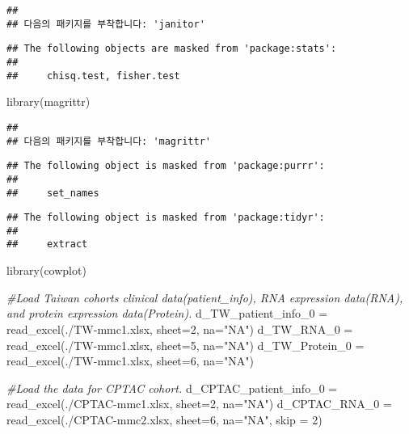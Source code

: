 \documentclass[
]{article}
\newenvironment{Shaded}{\begin{snugshade}}{\end{snugshade}}
\newcommand{\AttributeTok}[1]{\textcolor[rgb]{0.77,0.63,0.00}{#1}}
\newcommand{\CommentTok}[1]{\textcolor[rgb]{0.56,0.35,0.01}{\textit{#1}}}
\newcommand{\DecValTok}[1]{\textcolor[rgb]{0.00,0.00,0.81}{#1}}
\newcommand{\FunctionTok}[1]{\textcolor[rgb]{0.00,0.00,0.00}{#1}}
\newcommand{\NormalTok}[1]{#1}
\newcommand{\OtherTok}[1]{\textcolor[rgb]{0.56,0.35,0.01}{#1}}
\newcommand{\StringTok}[1]{\textcolor[rgb]{0.31,0.60,0.02}{#1}}
\begin{document}
\begin{verbatim}
## 
## 다음의 패키지를 부착합니다: 'janitor'
\end{verbatim}

\begin{verbatim}
## The following objects are masked from 'package:stats':
## 
##     chisq.test, fisher.test
\end{verbatim}

\begin{Shaded}
\begin{Highlighting}[]
\FunctionTok{library}\NormalTok{(magrittr)}
\end{Highlighting}
\end{Shaded}

\begin{verbatim}
## 
## 다음의 패키지를 부착합니다: 'magrittr'
\end{verbatim}

\begin{verbatim}
## The following object is masked from 'package:purrr':
## 
##     set_names
\end{verbatim}

\begin{verbatim}
## The following object is masked from 'package:tidyr':
## 
##     extract
\end{verbatim}

\begin{Shaded}
\begin{Highlighting}[]
\FunctionTok{library}\NormalTok{(cowplot)}

\CommentTok{\#Load Taiwan cohort\textquotesingle{}s clinical data(patient\_info), RNA expression data(RNA), and protein expression data(Protein).}
\NormalTok{d\_TW\_patient\_info\_0 }\OtherTok{=} \FunctionTok{read\_excel}\NormalTok{(}\StringTok{\textquotesingle{}./TW{-}mmc1.xlsx\textquotesingle{}}\NormalTok{, }\AttributeTok{sheet=}\DecValTok{2}\NormalTok{, }\AttributeTok{na=}\StringTok{"NA"}\NormalTok{)}
\NormalTok{d\_TW\_RNA\_0 }\OtherTok{=} \FunctionTok{read\_excel}\NormalTok{(}\StringTok{\textquotesingle{}./TW{-}mmc1.xlsx\textquotesingle{}}\NormalTok{, }\AttributeTok{sheet=}\DecValTok{5}\NormalTok{, }\AttributeTok{na=}\StringTok{"NA"}\NormalTok{)}
\NormalTok{d\_TW\_Protein\_0 }\OtherTok{=} \FunctionTok{read\_excel}\NormalTok{(}\StringTok{\textquotesingle{}./TW{-}mmc1.xlsx\textquotesingle{}}\NormalTok{, }\AttributeTok{sheet=}\DecValTok{6}\NormalTok{, }\AttributeTok{na=}\StringTok{"NA"}\NormalTok{)}

\CommentTok{\#Load the data for CPTAC cohort.}
\NormalTok{d\_CPTAC\_patient\_info\_0 }\OtherTok{=} \FunctionTok{read\_excel}\NormalTok{(}\StringTok{\textquotesingle{}./CPTAC{-}mmc1.xlsx\textquotesingle{}}\NormalTok{, }\AttributeTok{sheet=}\DecValTok{2}\NormalTok{, }\AttributeTok{na=}\StringTok{"NA"}\NormalTok{)}
\NormalTok{d\_CPTAC\_RNA\_0 }\OtherTok{=} \FunctionTok{read\_excel}\NormalTok{(}\StringTok{\textquotesingle{}./CPTAC{-}mmc2.xlsx\textquotesingle{}}\NormalTok{, }\AttributeTok{sheet=}\DecValTok{6}\NormalTok{, }\AttributeTok{na=}\StringTok{"NA"}\NormalTok{, }\AttributeTok{skip =} \DecValTok{2}\NormalTok{)}
\end{Highlighting}
\end{Shaded}
\end{document}
